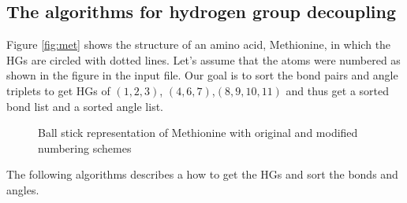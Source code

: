 \documentclass[11pt]{article}
\begin{document}
\subsection{The algorithms for hydrogen group decoupling}
Figure \ref{fig:met} shows the structure of an amino acid,
Methionine, in which the HGs are circled with dotted lines. 
Let's assume that the atoms were numbered as shown in the
figure in the input file. Our goal is to sort the bond pairs and angle
triplets to get HGs of $(1,2,3)$, $(4,6,7)$,$(8,9,10,11)$ and thus get a
sorted bond list and a sorted angle list.
\begin{figure}[hbt]
\centering

\caption{Ball stick representation of Methionine with original and
modified numbering schemes}
\end{figure}

The following algorithms describes a how to get the HGs and sort the
bonds and angles.
\end{document}
